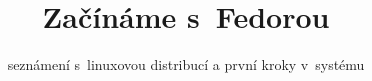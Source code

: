 \documentclass[a5paper,
              twoside,
              headings=small,
              titlepage=firstiscover,
              numbers=noenddot]{scrbook}%
\begin{document}
\title{Začínáme s~Fedorou}
\subtitle{seznámení s~linuxovou distribucí a první kroky v~systému}
\date{}
\maketitle

\cleardoublepage





%
%
\end{document}
